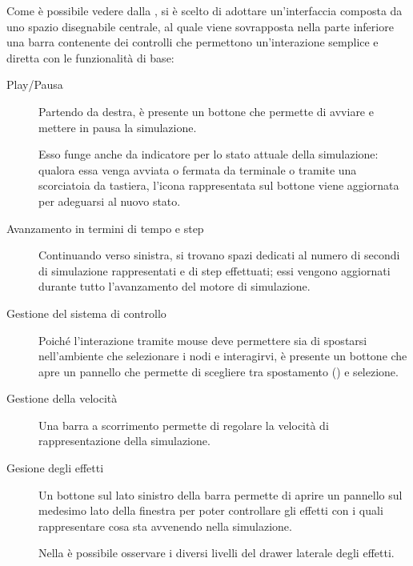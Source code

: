         Come è possibile vedere dalla , si è scelto di adottare un'interfaccia composta da uno spazio disegnabile centrale, al quale viene sovrapposta nella parte inferiore una barra contenente dei controlli che permettono un'interazione semplice e diretta con le funzionalità di base:

        \begin{description}
          \item [Play/Pausa] Partendo da destra, è presente un bottone che permette di avviare e mettere in pausa la simulazione.

          Esso funge anche da indicatore per lo stato attuale della simulazione: qualora essa venga avviata o fermata da terminale o tramite una scorciatoia da tastiera, l'icona rappresentata sul bottone viene aggiornata per adeguarsi al nuovo stato.

          \item[Avanzamento in termini di tempo e step] Continuando verso sinistra, si trovano spazi dedicati al numero di secondi di simulazione rappresentati e di step effettuati; essi vengono aggiornati durante tutto l'avanzamento del motore di simulazione.

          \item[Gestione del sistema di controllo] Poiché l'interazione tramite mouse deve permettere sia di spostarsi nell'ambiente che selezionare i nodi e interagirvi, è presente un bottone che apre un pannello che permette di scegliere tra spostamento () e selezione.

          \item[Gestione della velocità] Una barra a scorrimento permette di regolare la velocità di rappresentazione della simulazione.

          \item[Gesione degli effetti] Un bottone sul lato sinistro della barra permette di aprire un pannello sul medesimo lato della finestra per poter controllare gli effetti con i quali rappresentare cosa sta avvenendo nella simulazione.

          Nella  è possibile osservare i diversi livelli del drawer laterale degli effetti.


\end{description}

